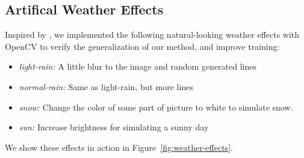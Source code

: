 \subsection{Artifical Weather Effects}
Inspired by \cite{weather-effects-tutorial}, we implemented the following
natural-looking weather effects with OpenCV to verify the generalization of our
method, and improve training:
\begin{itemize}
    \item \emph{light-rain:} A little blur to the image and random generated lines
    \item \emph{normal-rain:} Same as light-rain, but more lines
    \item \emph{snow:} Change the color of some part of picture to white to simulate snow.
    \item \emph{sun:} Increase brightness for simulating a sunny day
\end{itemize}

We show these effects in action in Figure~\ref{fig:weather-effects}.

